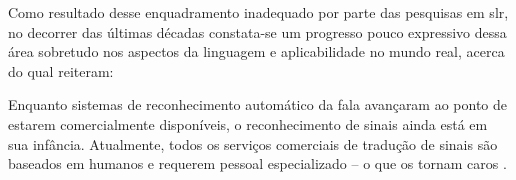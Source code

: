 


Como resultado desse enquadramento inadequado por parte das pesquisas em \acrshort{slr}, no decorrer das últimas décadas constata-se um progresso pouco expressivo dessa área sobretudo nos aspectos da linguagem e aplicabilidade no mundo real, acerca do qual  reiteram:


\begin{citacao}
    Enquanto sistemas de reconhecimento automático da fala avançaram ao ponto de estarem comercialmente disponíveis, o reconhecimento de sinais ainda está em sua infância. Atualmente, todos os serviços comerciais de tradução de sinais são baseados em humanos e requerem pessoal especializado – o que os tornam caros \cite[tradução nossa]{cooper-2011-slr}.
\end{citacao}





